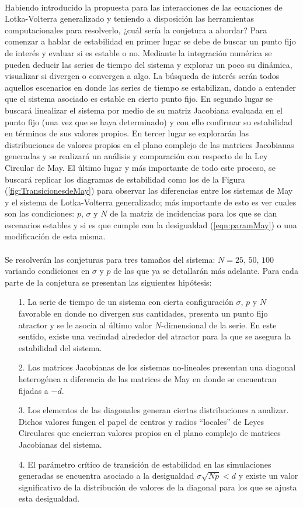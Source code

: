 \\
Habiendo introducido la propuesta para las interacciones de las ecuaciones de Lotka-Volterra generalizado y teniendo a disposición las herramientas computacionales para resolverlo, ¿cuál sería la conjetura a abordar? Para comenzar a hablar de estabilidad en primer lugar se debe de buscar un punto fijo de interés y evaluar si es estable o no. Mediante la integración numérica se pueden deducir las series de tiempo del sistema y explorar un poco su dinámica, visualizar si divergen o convergen a algo. La búsqueda de interés serán todos aquellos escenarios en donde las series de tiempo se estabilizan, dando a entender que el sistema asociado es estable en cierto punto fijo. En segundo lugar se buscará linealizar el sistema por medio de su matriz Jacobiana evaluada en el punto fijo (una vez que se haya determinado) y con ello confirmar su estabilidad en términos de sus valores propios.
\newpage
En tercer lugar se explorarán las distribuciones de valores propios en el plano complejo de las matrices Jacobianas generadas y se realizará un análisis y comparación con respecto de la Ley Circular de May. El último lugar y más importante de todo este proceso, se buscará replicar los diagramas de estabilidad como los de la Figura (\ref{fig:TransicionesdeMay}) para observar las diferencias entre los sistemas de May y el sistema de Lotka-Volterra generalizado; más importante de esto es ver cuales son las condiciones: $p$, $\sigma$ y $N$ de la matriz de incidencias para los que se dan escenarios estables y si es que cumple con la desigualdad (\ref{eqn:paramMay}) o una modificación de esta misma.
\\
\\
Se resolverán las conjeturas para tres tamaños del sistema: $N=25,\,50,\, 100$ variando condiciones en $\sigma$ y $p$ de las que ya se detallarán más adelante. Para cada parte de la conjetura se presentan las siguientes hipótesis:
\begin{itemize}
	\item[1.] La serie de tiempo de un sistema con cierta configuración $\sigma$, $p$ y $N$ favorable en donde no divergen sus cantidades, presenta un punto fijo atractor y se le asocia al último valor $N$-dimensional de la serie. En este sentido, existe una vecindad alrededor del atractor para la que se asegura la estabilidad del sistema.
	\item[2.] Las matrices Jacobianas de los sistemas no-lineales presentan una diagonal heterogénea a diferencia de las matrices de May en donde se encuentran fijadas a $-d$.
	\item[3.] Los elementos de las diagonales generan ciertas distribuciones a analizar. Dichos valores fungen el papel de centros y radios ``locales'' de Leyes Circulares que encierran valores propios en el plano complejo de matrices Jacobianas del sistema.
	\item[4.] El parámetro crítico de transición de estabilidad en las simulaciones generadas se encuentra asociado a la desigualdad $\sigma\sqrt{Np}<d$ y existe un valor significativo de la distribución de valores de la diagonal para los que se ajusta esta desigualdad.
\end{itemize}
